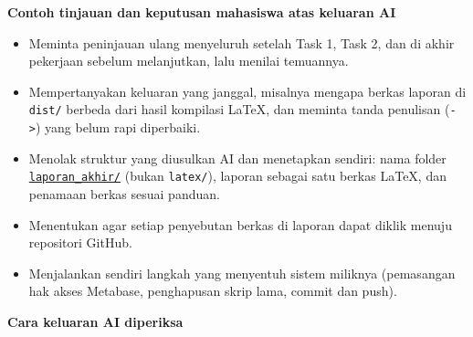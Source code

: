 \documentclass[10pt,a4paper]{article}
\providecommand{\tightlist}{\setlength{\itemsep}{1pt}\setlength{\parskip}{0pt}}
\begin{document}
\textbf{Contoh tinjauan dan keputusan mahasiswa atas keluaran AI}

\begin{itemize}
\tightlist
\item
  Meminta peninjauan ulang menyeluruh setelah Task 1, Task 2, dan di akhir pekerjaan sebelum melanjutkan, lalu menilai temuannya.
\item
  Mempertanyakan keluaran yang janggal, misalnya mengapa berkas laporan di \texttt{dist/} berbeda dari hasil kompilasi LaTeX, dan meminta tanda penulisan (\texttt{-\textgreater{}}) yang belum rapi diperbaiki.
\item
  Menolak struktur yang diusulkan AI dan menetapkan sendiri: nama folder \href{https://github.com/titan2903/kirana-omnichannel-performance-intelligence/tree/master/laporan_akhir}{\texttt{laporan\_\allowbreak{}akhir/}} (bukan \texttt{latex/}), laporan sebagai satu berkas LaTeX, dan penamaan berkas sesuai panduan.
\item
  Menentukan agar setiap penyebutan berkas di laporan dapat diklik menuju repositori GitHub.
\item
  Menjalankan sendiri langkah yang menyentuh sistem miliknya (pemasangan hak akses Metabase, penghapusan skrip lama, commit dan push).
\end{itemize}

\textbf{Cara keluaran AI diperiksa}
\end{document}
